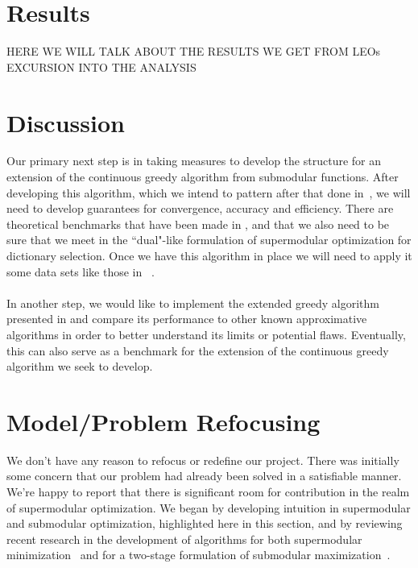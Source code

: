 \documentclass{article}
\begin{document}
\section{Results}\label{sec:results}

HERE WE WILL TALK ABOUT THE RESULTS WE GET FROM LEOs EXCURSION INTO THE ANALYSIS


\section{Discussion}\label{sec:discuss}

Our primary next step is in taking measures to develop the structure for an extension of the continuous greedy algorithm from submodular functions. After developing this algorithm, which we intend to pattern after that done in~\cite{Singer16TwoStage}, we will need to develop guarantees for convergence, accuracy and efficiency. There are theoretical benchmarks that have been made in \cite{greedy_selection}, \cite{Krause05near-optimalnonmyopic} and \cite{nonconvexrelax} that we also need to be sure that we meet in the ``dual"-like formulation of supermodular optimization for dictionary selection. Once we have this algorithm in place we will need to apply it some data sets like those in ~\cite{Singer16TwoStage}.
\\
\\
In another step, we would like to implement the extended greedy algorithm presented in \cite{BoutsidisLS15} and compare its performance to other known approximative algorithms in order to better understand its limits or potential flaws. Eventually, this can also serve as a benchmark for the extension of the continuous greedy algorithm we seek to develop.

\section{Model/Problem Refocusing} \label{model}
We don't have any reason to refocus or redefine our project. There was initially some concern that our problem had already been solved in a satisfiable manner. We're happy to report that there is significant room for contribution in the realm of supermodular optimization. We began by developing intuition in supermodular and submodular optimization, highlighted here in this section, and by reviewing recent research in the development of algorithms for both supermodular minimization~\cite{BoutsidisLS15} and for a two-stage formulation of submodular maximization~\cite{Singer16TwoStage}. 
\end{document}
